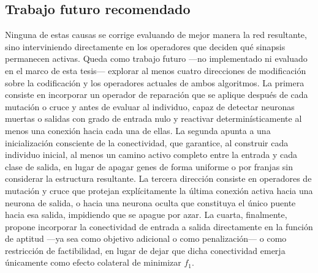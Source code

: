 \subsection{Trabajo futuro recomendado}
\label{sec:conectividad-trabajo-futuro}

Ninguna de estas causas se corrige evaluando de mejor manera la red resultante, sino interviniendo directamente en los operadores que deciden qué sinapsis permanecen activas. Queda como trabajo futuro —no implementado ni evaluado en el marco de esta tesis— explorar al menos cuatro direcciones de modificación sobre la codificación y los operadores actuales de ambos algoritmos. La primera consiste en incorporar un operador de reparación que se aplique después de cada mutación o cruce y antes de evaluar al individuo, capaz de detectar neuronas muertas o salidas con grado de entrada nulo y reactivar determinísticamente al menos una conexión hacia cada una de ellas. La segunda apunta a una inicialización consciente de la conectividad, que garantice, al construir cada individuo inicial, al menos un camino activo completo entre la entrada y cada clase de salida, en lugar de apagar genes de forma uniforme o por franjas sin considerar la estructura resultante. La tercera dirección consiste en operadores de mutación y cruce que protejan explícitamente la última conexión activa hacia una neurona de salida, o hacia una neurona oculta que constituya el único puente hacia esa salida, impidiendo que se apague por azar. La cuarta, finalmente, propone incorporar la conectividad de entrada a salida directamente en la función de aptitud —ya sea como objetivo adicional o como penalización— o como restricción de factibilidad, en lugar de dejar que dicha conectividad emerja únicamente como efecto colateral de minimizar $f_1$.